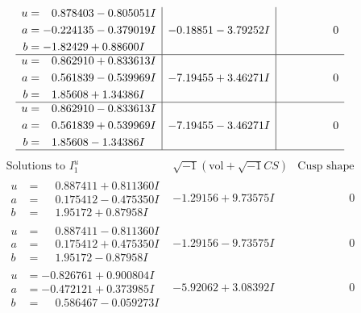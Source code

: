 \documentclass[1p]{elsarticle_modified}
\theoremstyle{definition}
\newcommand{\I}{\sqrt{-1}}
\begin{document}
$$\begin{array}{c|c|c}
\begin{aligned}
u &= \phantom{-}0.878403 - 0.805051 I \\
a &= -0.224135 - 0.379019 I \\
b &= -1.82429 + 0.88600 I\end{aligned}
 & -0.18851 - 3.79252 I & \phantom{-0.000000 } 0 \\ \hline\begin{aligned}
u &= \phantom{-}0.862910 + 0.833613 I \\
a &= \phantom{-}0.561839 - 0.539969 I \\
b &= \phantom{-}1.85608 + 1.34386 I\end{aligned}
 & -7.19455 + 3.46271 I & \phantom{-0.000000 } 0 \\ \hline\begin{aligned}
u &= \phantom{-}0.862910 - 0.833613 I \\
a &= \phantom{-}0.561839 + 0.539969 I \\
b &= \phantom{-}1.85608 - 1.34386 I\end{aligned}
 & -7.19455 - 3.46271 I & \phantom{-0.000000 } 0\\
 \hline 
 \end{array}$$\newpage$$\begin{array}{c|c|c}  
\text{Solutions to }I^u_{1}& \I (\text{vol} + \sqrt{-1}CS) & \text{Cusp shape}\\
 \hline 
\begin{aligned}
u &= \phantom{-}0.887411 + 0.811360 I \\
a &= \phantom{-}0.175412 - 0.475350 I \\
b &= \phantom{-}1.95172 + 0.87958 I\end{aligned}
 & -1.29156 + 9.73575 I & \phantom{-0.000000 } 0 \\ \hline\begin{aligned}
u &= \phantom{-}0.887411 - 0.811360 I \\
a &= \phantom{-}0.175412 + 0.475350 I \\
b &= \phantom{-}1.95172 - 0.87958 I\end{aligned}
 & -1.29156 - 9.73575 I & \phantom{-0.000000 } 0 \\ \hline\begin{aligned}
u &= -0.826761 + 0.900804 I \\
a &= -0.472121 + 0.373985 I \\
b &= \phantom{-}0.586467 - 0.059273 I\end{aligned}
 & -5.92062 + 3.08392 I & \phantom{-0.000000 } 0 \\ \hline\begin{aligned}

\end{aligned}
\end{array}$$
\end{document}

